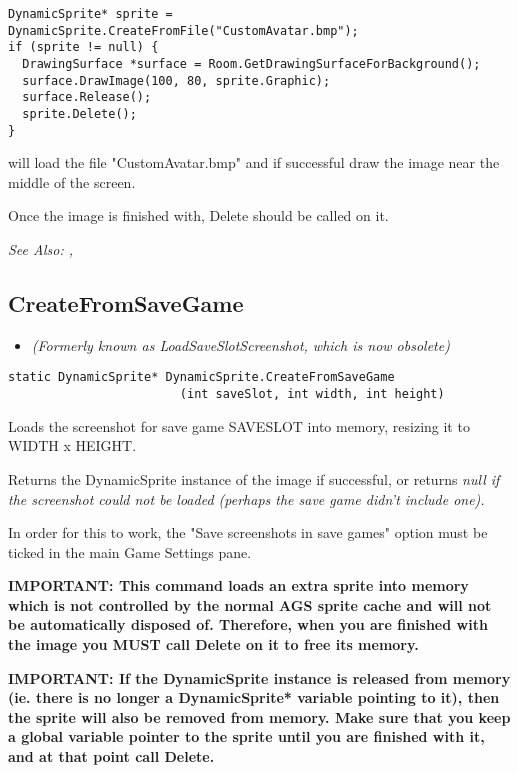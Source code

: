 \begin{verbatim}
DynamicSprite* sprite = DynamicSprite.CreateFromFile("CustomAvatar.bmp");
if (sprite != null) {
  DrawingSurface *surface = Room.GetDrawingSurfaceForBackground();
  surface.DrawImage(100, 80, sprite.Graphic);
  surface.Release();
  sprite.Delete();
}
\end{verbatim}
will load the file "CustomAvatar.bmp" and if successful draw the image near the middle
of the screen.

Once the image is finished with, Delete should be called on it.

\it{See Also:} ,


\subsection{CreateFromSaveGame}\label{DynamicSprite.CreateFromSaveGame}%

\begin{itemize}
\item \it{(Formerly known as LoadSaveSlotScreenshot, which is now obsolete)}
\end{itemize}

\begin{verbatim}
static DynamicSprite* DynamicSprite.CreateFromSaveGame
                        (int saveSlot, int width, int height)
\end{verbatim}
Loads the screenshot for save game SAVESLOT into memory, resizing it to WIDTH x HEIGHT.

Returns the DynamicSprite instance of the image if successful, or returns \it{null} if
the screenshot could not be loaded (perhaps the save game didn't include one).

In order for this to work, the "Save screenshots in save games" option must be ticked
in the main Game Settings pane.

\bf{IMPORTANT:} This command loads an extra sprite into memory which is not controlled
by the normal AGS sprite cache and will not be automatically disposed of. Therefore, when
you are finished with the image you \bf{MUST} call Delete on it to free its memory.

\bf{IMPORTANT:} If the DynamicSprite instance is released from memory (ie. there is
no longer a DynamicSprite* variable pointing to it), then the sprite will also be
removed from memory. Make sure that you keep a global variable pointer to the sprite
until you are finished with it, and at that point call Delete.

